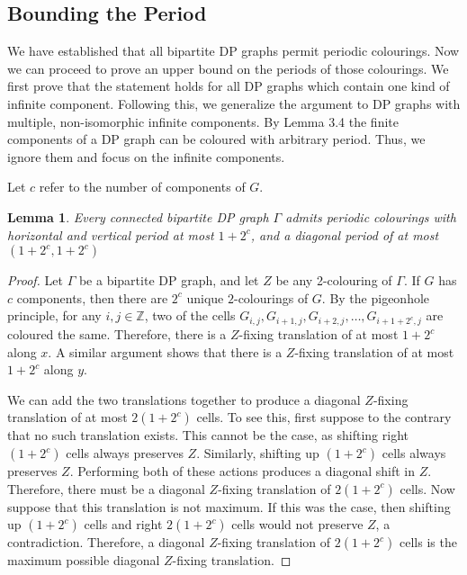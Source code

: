 \documentclass[letterpaper]{article}
\newtheorem{lemma}[theorem]{Lemma}
\newcommand{\integers}          {\mathbb{Z}}
\begin{document}
\subsection{Bounding the Period}

We have established that all bipartite DP graphs permit periodic colourings.
Now we can proceed to prove an upper bound on the periods of those colourings.
We first prove that the statement holds for all DP graphs which contain one kind of infinite component.
Following this, we generalize the argument to DP graphs with multiple, non-isomorphic infinite components.
By Lemma 3.4 the finite components of a DP graph can be coloured with arbitrary period.
Thus, we ignore them and focus on the infinite components.

Let $c$ refer to the number of components of $G$.

\begin{lemma}
Every connected bipartite DP graph $\Gamma$ admits periodic colourings with horizontal and vertical period at most $1+2^c$, and a diagonal period of at most $(1+2^c, 1+2^c)$
\end{lemma}

\begin{proof}
Let $\Gamma$ be a bipartite DP graph, and let $Z$ be any 2-colouring of $\Gamma$.
If $G$ has $c$ components, then there are $2^c$ unique $2$-colourings of $G$.
By the pigeonhole principle, for any $i,j \in \integers$, two of the cells $G_{i,j}, G_{i+1, j}, G_{i+2, j}, \ldots, G_{i+1+2^c, j}$ are coloured the same.
Therefore, there is a $Z$-fixing translation of at most $1+2^c$ along $x$.
A similar argument shows that there is a $Z$-fixing translation of at most $1+2^c$ along $y$.

We can add the two translations together to produce a diagonal $Z$-fixing translation of at most $2(1+2^c)$ cells.
To see this, first suppose to the contrary that no such translation exists.
This cannot be the case, as shifting right $(1+2^c)$ cells always preserves $Z$.
Similarly, shifting up $(1+2^c)$ cells always preserves $Z$.
Performing both of these actions produces a diagonal shift in $Z$.
Therefore,  there must be a diagonal $Z$-fixing translation of $2(1+2^c)$ cells.
Now suppose that this translation is not maximum.
If this was the case, then shifting up $(1+2^c)$ cells and right $2(1+2^c)$ cells would not preserve $Z$, a contradiction.
Therefore, a diagonal $Z$-fixing translation of $2(1+2^c)$ cells is the maximum possible diagonal $Z$-fixing translation.
\end{proof}
\end{document}
